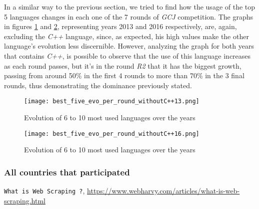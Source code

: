 \documentclass{article}
\begin{document}
\begin{multicols*}{2}
In a similar way to the previous section, we tried to find how the usage of the top 5 languages changes in each one of the 7 rounds of \textit{GCJ} competition.
The graphs in figures \ref{fig:best5_evo_round_13} and \ref{fig:best5_evo_round_16}, representing years 2013 and 2016 respectively, are, again, excluding the \textit{C++} language, since, as expected, his high values make the other language's evolution less discernible.
However, analyzing the graph for both years that contains \textit{C++}, is possible to observe that the use of this language increases as each round passes, but it's in the round \textit{R2} that it has the biggest growth, passing from around 50\% in the first 4 rounds to more than 70\% in the 3 final rounds, thus demonstrating the dominance previously stated.




\begin{figure}[H]
    \centering
    \texttt{[image: best\_five\_evo\_per\_round\_withoutC++13.png]}
    \caption{Evolution of 6 to 10 most used languages over the years}
    \label{fig:best5_evo_round_13}
\end{figure}

\begin{figure}[H]
    \centering
    \texttt{[image: best\_five\_evo\_per\_round\_withoutC++16.png]}
    \caption{Evolution of 6 to 10 most used languages over the years}
    \label{fig:best5_evo_round_16}
\end{figure}


\subsubsection{All countries that participated}




\begin{thebibliography}{1}

\raggedright \texttt{What is Web Scraping ?}, \url{https://www.webharvy.com/articles/what-is-web-scraping.html}


\end{thebibliography}
\end{multicols*}
\end{document}
